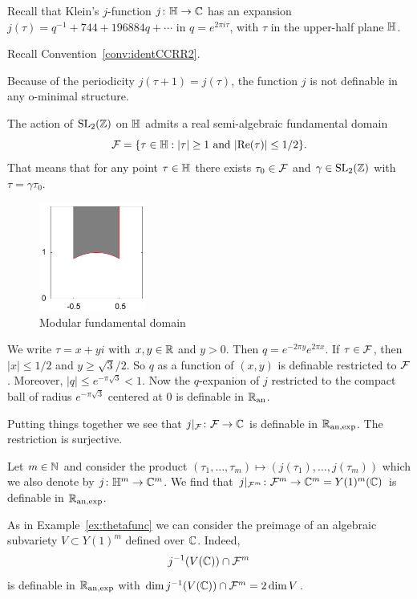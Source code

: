 \begin{example}
  \label{ex:jfunction}
  Recall that Klein's $j$-function $j\colon {\mathbb{H}}\rightarrow{\mathbb{C}}$ has an
  expansion $j(\tau)=q^{-1}+744+196884q+\cdots$
  in $q = e^{2\pi i \tau}$, with $\tau$ in the upper-half plane ${\mathbb{H}}$.

  Recall Convention~\ref{conv:identCCRR2}.
  
  Because of the periodicity $j(\tau+1)=j(\tau)$, the function
  $j$ is not definable in any o-minimal structure.

  The action of $\mathrm{SL}_2({\mathbb{Z}})$ on ${\mathbb{H}}$ admits a real semi-algebraic
  fundamental domain %
  \begin{equation*}
    {\mathcal F} = \{ \tau\in {\mathbb{H}}: |\tau|\ge 1 \text{ and
    }|\mathrm{Re}(\tau)|\le 1/2\}.
  \end{equation*}
  That means that 
  for any point $\tau\in{\mathbb{H}}$ there exists $\tau_0\in {\mathcal F}$ and
  $\gamma\in \mathrm{SL}_2({\mathbb{Z}})$ with $\tau=\gamma\tau_0$.
  
  \begin{figure}
    \label{fig:modfd}
    \centering
    \includegraphics[width=3.5cm]{fd.png}
    \caption{Modular fundamental domain}
  \end{figure}

  We write $\tau = x+yi$ with $x,y\in{\mathbb{R}}$ and $y>0$.
  Then $q=e^{-2\pi y} e^{2\pi x}$.
  If $\tau\in {\mathcal F}$, then $|x|\le 1/2$ and $y\ge \sqrt{3}/2$.
  So $q$ as a function of $(x,y)$ is definable restricted to
  ${\mathcal F}$. Moreover, $|q|\le e^{-\pi\sqrt{3}}< 1$. Now
  the $q$-expanion of $j$ restricted to the compact ball of radius
  $e^{-\pi\sqrt{3}}$ centered at $0$ is definable in ${{\mathbb{R}}_{\mathrm{an}}}$.

  Putting things together we see that $j|_{{\mathcal F}}\colon
  {\mathcal F}\rightarrow{\mathbb{C}}$ is definable in ${{\mathbb{R}}_{\mathrm{an,exp}}}$. The restriction is
  surjective.

  Let $m\in{\mathbb{N}}$ and consider the product $(\tau_1,\ldots,\tau_m)\mapsto
  (j(\tau_1),\ldots,j(\tau_m))$ which we also denote by
  $j\colon{\mathbb{H}}^m\rightarrow{\mathbb{C}}^m$. We find that
  $j|_{{\mathcal F}^m}\colon {\mathcal F}^m\rightarrow{\mathbb{C}}^m=Y(1)^m({\mathbb{C}})$
  is definable in ${{\mathbb{R}}_{\mathrm{an,exp}}}$.

  As in Example~\ref{ex:thetafunc} we can consider the preimage of an
  algebraic subvariety $V\subset Y(1)^m$ defined over ${\mathbb{C}}$.
  Indeed,
  \begin{equation*}
    j^{-1}(V({\mathbb{C}})) \cap {\mathcal F}^m
  \end{equation*}
  is definable in ${{\mathbb{R}}_{\mathrm{an,exp}}}$ with $\dim j^{-1}(V({\mathbb{C}}))\cap {\mathcal F}^m =
  2\dim V$.  
\end{example}

